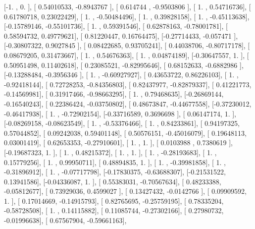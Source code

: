 \documentclass{article}
\begin{document}
       [-1.        ,  0.        ],
       [ 0.54010533, -0.8943767 ],
       [ 0.614744  , -0.9503806 ],
       [ 1.        ,  0.54716736],
       [ 0.61780718,  0.23022429],
       [ 1.        , -0.50484496],
       [ 1.        ,  0.39828158],
       [ 1.        , -0.45113638],
       [-0.15789146, -0.55101736],
       [ 1.        ,  0.59391546],
       [ 0.62878163, -0.78001781],
       [ 0.58594732,  0.49779621],
       [ 0.81220447,  0.16764475],
       [-0.27714433, -0.057471  ],
       [-0.30807322,  0.9027845 ],
       [ 0.08422685,  0.93705241],
       [ 0.44038706, -0.80717178],
       [ 0.08679205,  0.31473667],
       [ 1.        ,  0.54676363],
       [ 1.        ,  0.04874189],
       [-0.30647557,  1.        ],
       [ 0.50951498,  0.11402618],
       [ 0.23085521, -0.82995646],
       [ 0.68152633, -0.6882986 ],
       [-0.13288484, -0.3956346 ],
       [ 1.        , -0.60927927],
       [ 0.43653722,  0.86226103],
       [ 1.        , -0.92418144],
       [ 0.72728253, -0.84356803],
       [ 0.82437977, -0.82879337],
       [ 0.41221773, -0.14569981],
       [ 0.31917466, -0.98663295],
       [ 1.        ,  0.79468635],
       [-0.26869144, -0.16540243],
       [ 0.22386424, -0.03750802],
       [ 0.48673847, -0.44677558],
       [-0.37230012, -0.46417938],
       [ 1.        , -0.72902154],
       [-0.33716589,  0.3696698 ],
       [ 0.06147174,  1.        ],
       [-0.08269158, -0.08623549],
       [ 1.        , -0.53376466],
       [ 1.        ,  0.84233861],
       [ 0.94197325,  0.57044852],
       [ 0.09242038,  0.59401148],
       [ 0.50576151, -0.45016079],
       [ 0.19648113,  0.03001419],
       [ 0.62653353, -0.27910601],
       [ 1.        ,  1.        ],
       [ 0.0103988 ,  0.7380619 ],
       [-0.19687323,  1.        ],
       [ 1.        ,  0.48215372],
       [ 1.        ,  1.        ],
       [ 1.        , -0.28193683],
       [ 1.        ,  0.15779256],
       [ 1.        ,  0.99950711],
       [ 0.48894835,  1.        ],
       [ 1.        , -0.39981858],
       [ 1.        , -0.31896912],
       [ 1.        , -0.07717798],
       [-0.17830375, -0.63688307],
       [-0.21531522,  0.13941586],
       [-0.04336087,  1.        ],
       [ 0.55383031, -0.70567634],
       [ 0.48233388, -0.05812677],
       [ 0.73929036,  0.4599027 ],
       [ 0.13427432, -0.0142766 ],
       [ 0.09909592,  1.        ],
       [ 0.17014669, -0.14915793],
       [ 0.82765695, -0.25759195],
       [ 0.78335204, -0.58728508],
       [ 1.        ,  0.14115882],
       [ 0.11085744, -0.27302166],
       [ 0.27980732, -0.01996638],
       [ 0.67567904, -0.59661163],
\end{document}
